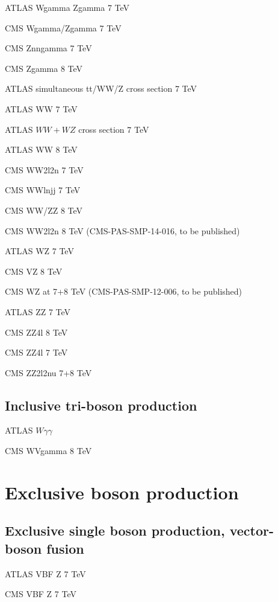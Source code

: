 \documentclass[12pt]{iopart}
\begin{document}
ATLAS Wgamma Zgamma 7 TeV~\cite{Aad:2013izg}

CMS Wgamma/Zgamma 7 TeV~\cite{Chatrchyan:2013fya}

CMS Znngamma 7 TeV~\cite{Chatrchyan:2013nda}

CMS Zgamma 8 TeV~\cite{Khachatryan:2015kea}


ATLAS simultaneous tt/WW/Z cross section 7 TeV~\cite{Aad:2014jra}

ATLAS WW 7 TeV~\cite{ATLAS:2012mec}

ATLAS $WW+WZ$ cross section 7 TeV~\cite{Aad:2014mda}

ATLAS WW 8 TeV~\cite{ATLAS-CONF-2014-033}

CMS WW2l2n 7 TeV~\cite{Chatrchyan:2013yaa}

CMS WWlnjj 7 TeV~\cite{Chatrchyan:2012bd}

CMS WW/ZZ 8 TeV~\cite{Chatrchyan:2013oev}

CMS WW2l2n 8 TeV (CMS-PAS-SMP-14-016, to be published)


ATLAS WZ 7 TeV~\cite{Aad:2012twa}

CMS VZ 8 TeV~\cite{Chatrchyan:2014aqa}

CMS WZ at 7+8 TeV (CMS-PAS-SMP-12-006, to be published)


ATLAS ZZ 7 TeV~\cite{Aad:2012awa}

CMS ZZ4l 8 TeV~\cite{Khachatryan:2014dia}

CMS ZZ4l 7 TeV~\cite{Chatrchyan:2012sga}

CMS ZZ2l2nu 7+8 TeV~\cite{Khachatryan:2015pba}

\subsection{Inclusive tri-boson production}

ATLAS $W\gamma\gamma$~\cite{Aad:2015uqa}

CMS WVgamma 8 TeV~\cite{Chatrchyan:2014bza}

\section{Exclusive boson production}
\subsection{Exclusive single boson production, vector-boson fusion}

ATLAS VBF Z 7 TeV~\cite{Aad:2014dta}

CMS VBF Z 7 TeV~\cite{Chatrchyan:2013jya}
\end{document}
